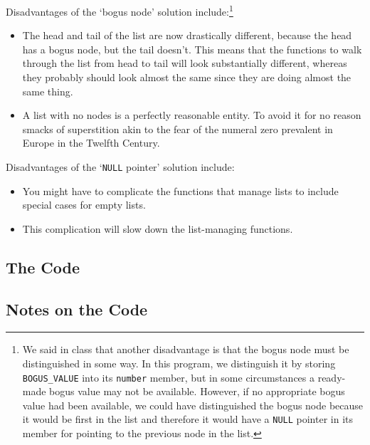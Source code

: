Disadvantages of the `bogus node' solution include:\footnote{We said in
class that another disadvantage is that the bogus node must be
distinguished in some way.  In this program, we distinguish it by
storing {\tt BOGUS\_VALUE} into its {\tt number} member, but in some
circumstances a ready-made bogus value may not be available.  However,
if no appropriate bogus value had been available, we could have
distinguished the bogus node because it would be first in the list and
therefore it would have a {\tt NULL} pointer in its member for pointing
to the previous node in the list.}

\begin{itemize}
\item The head and tail of the list are now drastically different,
because the head has a bogus node, but the tail doesn't.  This means
that the functions to walk through the list from head to tail will look
substantially different, whereas they probably should look almost the
same since they are doing almost the same thing.
\item A list with no nodes is a perfectly reasonable entity.  To avoid
it for no reason smacks of superstition akin to the fear of the numeral
zero prevalent in Europe in the Twelfth Century.
\end{itemize}

Disadvantages of the `{\tt NULL} pointer' solution include:

\begin{itemize}
\item You might have to complicate the functions that manage lists to
include special cases for empty lists.
\item This complication will slow down the list-managing functions.
\end{itemize}

\subsection{The Code}

{  }

\subsection{Notes on the Code}

